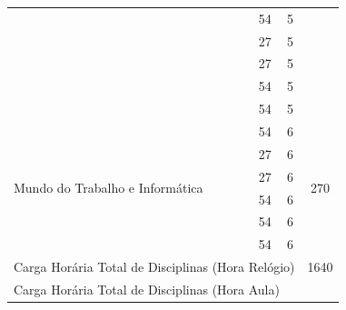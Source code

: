 \documentclass[
	10pt,				%
	openright,			%
	twoside,			%
	a4paper,			%
	english,			%
	french,				%
	brazil,				%
	sumario=tradicional
]{abntex2}
\begin{document}
\begin{table}[H]
{\begin{tabular}{|l|l|c|c|c|}
			& \nameref{5_metodologia}                         & 54                         &  5                &                      \\ \cline{2-4}
			& \nameref{5_libras}                              & 27                         &  5                &                      \\ \cline{2-4}
			& \nameref{5_etica}                               & 27                         &  5                &                      \\ \cline{2-4}
			& \nameref{5_sd}                                  & 54                         &  5                &                      \\ \cline{2-4}
			& \nameref{5_lab}                                 & 54                         &  5                &                      \\ \hline
			\multirow{6}{*}{Mundo do Trabalho e Informática}                           
			& \nameref{6_ia}                                  & 54                         &  6                & \multirow{6}{*}{270} \\ \cline{2-4}
			& \nameref{6_seginfo}                             & 27                         &  6                &                      \\ \cline{2-4}
			& \nameref{6_empdig}                              & 27                         &  6                &                      \\ \cline{2-4}
			& \nameref{6_datascience}                         & 54                         &  6                &                      \\ \cline{2-4}
			& \nameref{6_opta}                                & 54                         &  6                &                      \\ \cline{2-4}
			& \nameref{6_optb}                                & 54                         &  6                &                      \\ \hline
			\multicolumn{4}{|l|}{Carga Horária Total de Disciplinas (Hora Relógio)}                                                                                                                                                                                     
			& 1640                 \\ \hline
			\multicolumn{4}{|l|}{Carga Horária Total de Disciplinas (Hora Aula)}                                                                                                                                                                                        

\end{tabular}}
\end{table}
\end{document}
